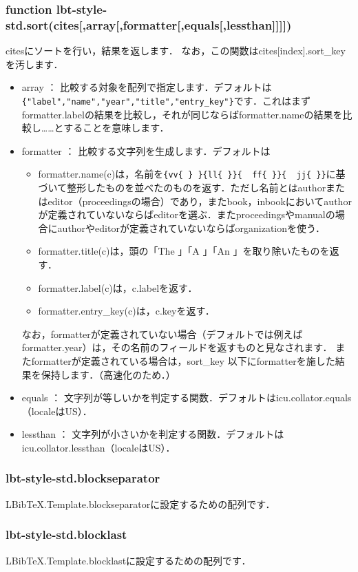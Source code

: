 \documentclass[dvipdfmx,a4paper]{jsarticle}
\begin{document}
\subsubsection{function lbt-style-std.sort(cites[,array[,formatter[,equals[,lessthan]]]])}
citesにソートを行い，結果を返します．
なお，この関数はcites[index].sort\_keyを汚します．
\begin{itemize}
\item array ： 比較する対象を配列で指定します．デフォルトは\verb|{"label","name","year","title","entry_key"}|です．これはまずformatter.labelの結果を比較し，それが同じならばformatter.nameの結果を比較し……とすることを意味します．
\item formatter ： 比較する文字列を生成します．デフォルトは
\begin{itemize}
\item formatter.name(c)は，名前を\verb|{vv{ } }{ll{ }}{  ff{ }}{  jj{ }}|に基づいて整形したものを並べたのものを返す．ただし名前とはauthorまたはeditor（proceedingsの場合）であり，またbook，inbookにおいてauthorが定義されていないならばeditorを選ぶ．またproceedingsやmanualの場合にauthorやeditorが定義されていないならばorganizationを使う．
\item formatter.title(c)は，頭の「The 」「A 」「An 」を取り除いたものを返す．
\item formatter.label(c)は，c.labelを返す．
\item formatter.entry\_key(c)は，c.keyを返す．
\end{itemize}
なお，formatterが定義されていない場合（デフォルトでは例えばformatter.year）は，その名前のフィールドを返すものと見なされます．
またformatterが定義されている場合は，sort\_key 以下にformatterを施した結果を保持します．（高速化のため．）
\item equals ： 文字列が等しいかを判定する関数．デフォルトはicu.collator.equals（localeはUS）．
\item lessthan ： 文字列が小さいかを判定する関数．デフォルトはicu.collator.lessthan（localeはUS）．
\end{itemize}

\subsubsection{lbt-style-std.blockseparator}
LBibTeX.Template.blockseparatorに設定するための配列です．

\subsubsection{lbt-style-std.blocklast}
LBibTeX.Template.blocklastに設定するための配列です．
\end{document}
